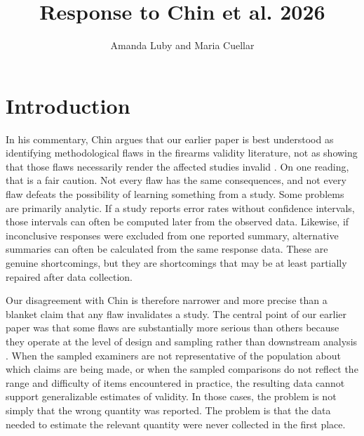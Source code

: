 \documentclass[11pt, oneside]{article}   	%
\title{Response to Chin et al. 2026}
\author{Amanda Luby and Maria Cuellar}
\begin{document}
\maketitle

\section{Introduction}

In his commentary, Chin argues that our earlier paper is best understood as identifying methodological flaws in the firearms validity literature, not as showing that those flaws necessarily render the affected studies invalid \cite{chin2026towards}. On one reading, that is a fair caution. Not every flaw has the same consequences, and not every flaw defeats the possibility of learning something from a study. Some problems are primarily analytic. If a study reports error rates without confidence intervals, those intervals can often be computed later from the observed data. Likewise, if inconclusive responses were excluded from one reported summary, alternative summaries can often be calculated from the same response data. These are genuine shortcomings, but they are shortcomings that may be at least partially repaired after data collection.

Our disagreement with Chin is therefore narrower and more precise than a blanket claim that any flaw invalidates a study. The central point of our earlier paper was that some flaws are substantially more serious than others because they operate at the level of design and sampling rather than downstream analysis \cite{cuellar2024methodological}. When the sampled examiners are not representative of the population about which claims are being made, or when the sampled comparisons do not reflect the range and difficulty of items encountered in practice, the resulting data cannot support generalizable estimates of validity. In those cases, the problem is not simply that the wrong quantity was reported. The problem is that the data needed to estimate the relevant quantity were never collected in the first place.
\end{document}
